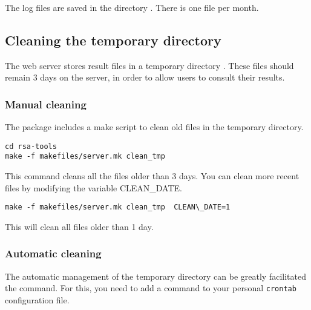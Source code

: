 \documentclass{article}
\begin{document}
The log files are saved in the directory . There
is one file per month.


\subsection{Cleaning the temporary directory}

The web server stores result files in a temporary directory
. These files should remain 3 days on
the server, in order to allow users to consult their results.

\subsubsection{Manual cleaning}

The \RSAT package includes a make script to clean old files in the
temporary directory.

\begin{verbatim}
cd rsa-tools
make -f makefiles/server.mk clean_tmp
\end{verbatim}

This command cleans all the files older than 3 days. You can clean
more recent files by modifying the variable CLEAN\_DATE.

\begin{verbatim}
make -f makefiles/server.mk clean_tmp  CLEAN\_DATE=1
\end{verbatim}

This will clean all files older than 1 day.

\subsubsection{Automatic cleaning}

The automatic management of the temporary directory can be greatly
facilitated the  command. For this, you need to add a
command to your personal \texttt{crontab} configuration file.
\end{document}
